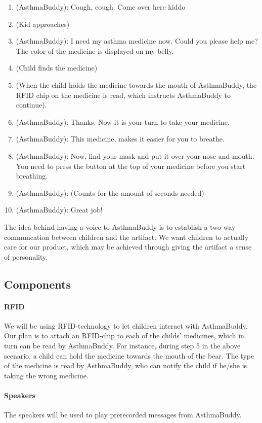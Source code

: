 \begin{enumerate}
  \item (AsthmaBuddy): Cough, cough. Come over here kiddo 
  \item (Kid approaches)
  \item (AsthmaBuddy): I need my asthma medicine now. Could you please help me? The color of the medicine is displayed on my belly.
  \item (Child finds the medicine)
  \item (When the child holds the medicine towards the mouth of AsthmaBuddy, the RFID chip on the medicine is read, which instructs AsthmaBuddy to continue). 
  \item (AsthmaBuddy): Thanks. Now it is your turn to take your medicine. 
  \item (AsthmaBuddy): This medicine, makes it easier for you to breathe. 
  \item (AsthmaBuddy): Now, find your mask and put it over your nose and mouth. You need to press the button at the top of your medicine before you start breathing. 
  \item (AsthmaBuddy): (Counts for the amount of seconds needed)
  \item (AsthmaBuddy): Great job!
\end{enumerate}

The idea behind having a voice to AsthmaBuddy is to establish a two-way communcation between children and the artifact. We want children to actually care for our product, which may be achieved through giving the artifact a sense of personality. 


\subsection{Components}

\paragraph{RFID}
We will be using RFID-technology to let children interact with AsthmaBuddy. Our plan is to attach an RFID-chip to each of the childs' medicines, which in turn can be read by AsthmaBuddy. For instance, during step 5 in the above scenario, a child can hold the medicine towards the mouth of the bear. The type of the medicine is read by AsthmaBuddy, who can notify the child if he/she is taking the wrong medicine. 

\paragraph{Speakers}
The speakers will be used to play prerecorded messages from AsthmaBuddy.

